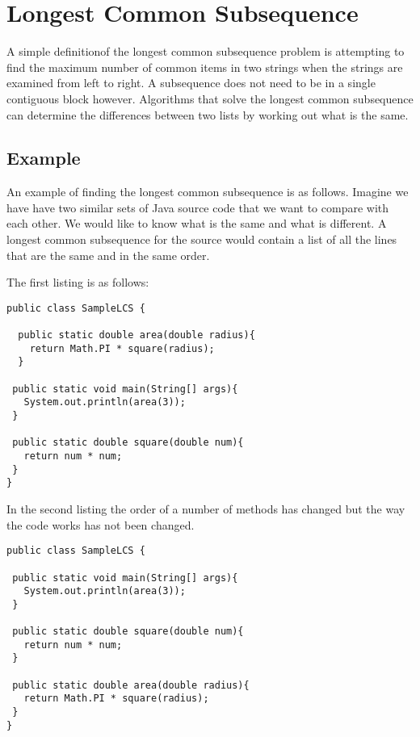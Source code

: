 \section{Longest Common Subsequence}
A simple definitionof the longest common subsequence problem is attempting to find the maximum number of common items in two strings when the strings are examined from left to right. A subsequence does not need to be in a single contiguous block however. Algorithms that solve the longest common subsequence can determine the differences between two lists by working out what is the same.   


\subsection{Example}
An example of finding the longest common subsequence is as follows.
Imagine we have have two similar sets of Java source code that we want to compare with each other.  
We would like to know what is the same and what is different.
A longest common subsequence for the source would contain a list of all the lines that are the same and in the same order.

The first listing is as follows:

\begin{lstlisting}
public class SampleLCS { 

  public static double area(double radius){
    return Math.PI * square(radius);
  }
  
 public static void main(String[] args){
   System.out.println(area(3));
 }
 
 public static double square(double num){
   return num * num;
 }
}

\end{lstlisting}

In the second listing the order of a number of methods has changed but the way the code works has not been changed.

\begin{lstlisting}
public class SampleLCS {

 public static void main(String[] args){
   System.out.println(area(3));
 }
 
 public static double square(double num){
   return num * num;
 }
 
 public static double area(double radius){
   return Math.PI * square(radius);
 }
}

\end{lstlisting}

